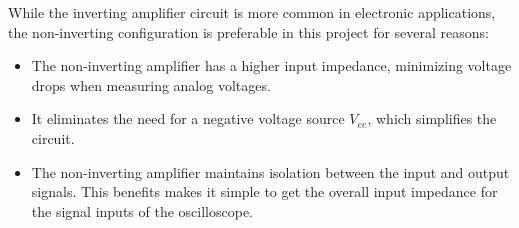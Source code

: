 While the \glqq{}inverting amplifier\grqq{} circuit is more common in electronic applications, the non-inverting configuration is preferable in this project for several reasons:
\begin{itemize}
	\item The non-inverting amplifier has a higher input impedance, minimizing voltage drops when measuring analog voltages.
	\item It eliminates the need for a negative voltage source $V_{ee}$, which simplifies the circuit.
	\item The non-inverting amplifier maintains isolation between the input and output signals. This benefits makes it simple to get the overall input impedance for the signal inputs of the oscilloscope.
\end{itemize}
